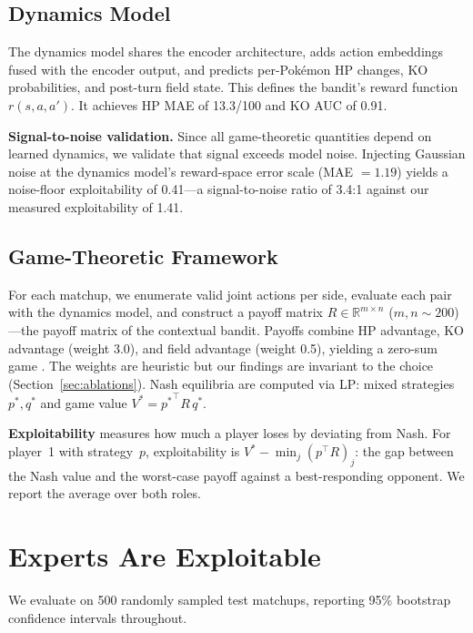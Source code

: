 \documentclass{article}
\begin{document}
\subsection{Dynamics Model}

The dynamics model shares the encoder architecture, adds action embeddings fused with the encoder output, and predicts per-Pok\'emon HP changes, KO probabilities, and post-turn field state. This defines the bandit's reward function $r(s,a,a')$. It achieves HP MAE of 13.3/100 and KO AUC of 0.91.

\textbf{Signal-to-noise validation.} Since all game-theoretic quantities depend on learned dynamics, we validate that signal exceeds model noise. Injecting Gaussian noise at the dynamics model's reward-space error scale (MAE $= 1.19$) yields a noise-floor exploitability of 0.41---a signal-to-noise ratio of 3.4:1 against our measured exploitability of 1.41.

\subsection{Game-Theoretic Framework}

For each matchup, we enumerate valid joint actions per side, evaluate each pair with the dynamics model, and construct a payoff matrix $R \in \mathbb{R}^{m \times n}$ ($m, n \sim 200$)---the payoff matrix of the contextual bandit. Payoffs combine HP advantage, KO advantage (weight 3.0), and field advantage (weight 0.5), yielding a zero-sum game \citep{poke-env, openai2019dota, ishii2018fighting}. The weights are heuristic but our findings are invariant to the choice (Section~\ref{sec:ablations}). Nash equilibria are computed via LP: mixed strategies $p^*, q^*$ and game value $V^* = {p^*}^\top R\, q^*$.

\textbf{Exploitability} measures how much a player loses by deviating from Nash. For player~1 with strategy~$p$, exploitability is $V^* - \min_j (p^\top R)_j$: the gap between the Nash value and the worst-case payoff against a best-responding opponent. We report the average over both roles.

\section{Experts Are Exploitable}
\label{sec:convention}

We evaluate on 500 randomly sampled test matchups, reporting 95\% bootstrap confidence intervals throughout.
\end{document}
